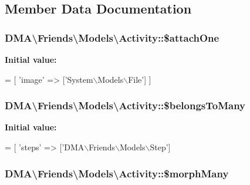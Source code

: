 \subsection{Member Data Documentation}
\hypertarget{classDMA_1_1Friends_1_1Models_1_1Activity_a9911cb733cbc863cc1bdccde254404b5}{
\subsubsection[{\$attach\-One}]{\setlength{\rightskip}{0pt plus 5cm}D\-M\-A\textbackslash{}\-Friends\textbackslash{}\-Models\textbackslash{}\-Activity\-::\$attach\-One}}\label{classDMA_1_1Friends_1_1Models_1_1Activity_a9911cb733cbc863cc1bdccde254404b5}
{\bfseries Initial value\-:}
\begin{DoxyCode}
= [
        \textcolor{stringliteral}{'image'} => [\textcolor{stringliteral}{'System\(\backslash\)Models\(\backslash\)File'}]
    ]
\end{DoxyCode}
\hypertarget{classDMA_1_1Friends_1_1Models_1_1Activity_ae5245e6eb74228cd54d8ae77e5a9bb38}{
\subsubsection[{\$belongs\-To\-Many}]{\setlength{\rightskip}{0pt plus 5cm}D\-M\-A\textbackslash{}\-Friends\textbackslash{}\-Models\textbackslash{}\-Activity\-::\$belongs\-To\-Many}}\label{classDMA_1_1Friends_1_1Models_1_1Activity_ae5245e6eb74228cd54d8ae77e5a9bb38}
{\bfseries Initial value\-:}
\begin{DoxyCode}
= [
        \textcolor{stringliteral}{'steps'}         => [\textcolor{stringliteral}{'DMA\(\backslash\)Friends\(\backslash\)Models\(\backslash\)Step'}]
\end{DoxyCode}
\hypertarget{classDMA_1_1Friends_1_1Models_1_1Activity_a192fdaacf609961b7a436d2b967dfd60}{
\subsubsection[{\$morph\-Many}]{\setlength{\rightskip}{0pt plus 5cm}D\-M\-A\textbackslash{}\-Friends\textbackslash{}\-Models\textbackslash{}\-Activity\-::\$morph\-Many}}\label{classDMA_1_1Friends_1_1Models_1_1Activity_a192fdaacf609961b7a436d2b967dfd60}
